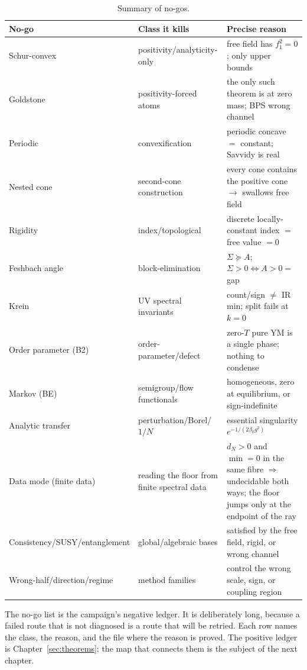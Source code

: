 \begin{table}[t]
\centering
\footnotesize
\begin{tabularx}{\textwidth}{@{}>{\raggedright\arraybackslash}p{2.8cm}
  >{\raggedright\arraybackslash}p{4.2cm}>{\raggedright\arraybackslash}X@{}}
\toprule
\textbf{No-go} & \textbf{Class it kills} & \textbf{Precise reason}\\
\midrule
Schur-convex & positivity/analyticity-only & free field has $f_1^2=0$; only upper bounds\\
Goldstone & positivity-forced atoms & the only such theorem is at zero mass; BPS wrong channel\\
Periodic & convexification & periodic concave $=$ constant; Savvidy is real\\
Nested cone & second-cone construction & every cone contains the positive cone $\to$ swallows
  free field\\
Rigidity & index/topological & discrete locally-constant index $=$ free value $=0$\\
Feshbach angle & block-elimination & $\Sigma\succeq A$; $\Sigma>0\iff A>0=$ gap\\
Krein & UV spectral invariants & count/sign $\ne$ IR min; split fails at $k=0$\\
Order parameter (B2) & order-parameter/defect & zero-$T$ pure YM is a single phase; nothing to
  condense\\
Markov (BE) & semigroup/flow functionals & homogeneous, zero at equilibrium, or sign-indefinite\\
Analytic transfer & perturbation/Borel/$1/N$ & essential singularity $e^{-1/(2\beta_0g^2)}$\\
Data mode (finite data) & reading the floor from finite spectral data & $d_N>0$ and $\min=0$ in the
  same fibre $\Rightarrow$ undecidable both ways; the floor jumps only at the endpoint of the ray\\
Consistency/SUSY/entanglement & global/algebraic bases & satisfied by the free field, rigid, or
  wrong channel\\
Wrong-half/direction/regime & method families & control the wrong scale, sign, or coupling
  region\\
\bottomrule
\end{tabularx}
\caption{Summary of no-gos.}
\label{tab:nogos}
\end{table}

The no-go list is the campaign's negative ledger. It is deliberately long, because a failed
route that is not diagnosed is a route that will be retried. Each row names the class, the reason,
and the file where the reason is proved. The positive ledger is Chapter~\ref{sec:theorems}; the
map that connects them is the subject of the next chapter.
